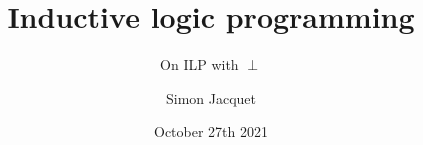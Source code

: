 \documentclass{beamer}
\title[Inductive logic programming]{Inductive logic programming}
\subtitle{On ILP with $\perp$}
\author{Simon Jacquet}
\institute[Unamur]{Faculty of Computer Science\\Unamur}
\date{October 27th 2021}
\begin{document}
\frame{\titlepage}


\end{document}

